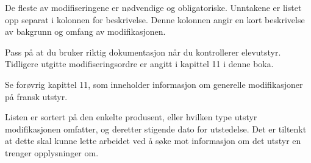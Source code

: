 De fleste av modifiseringene er nødvendige og obligatoriske. Unntakene er listet opp separat i kolonnen for beskrivelse. Denne kolonnen angir en kort beskrivelse av bakgrunn og omfang av modifikasjonen.

Pass på at du bruker riktig dokumentasjon når du kontrollerer elevutstyr. Tidligere utgitte modifiseringsordre er angitt i kapittel 11 i denne boka.

Se forøvrig kapittel 11, som inneholder informasjon om generelle modifikasjoner på fransk utstyr.

Listen er sortert på den enkelte produsent, eller hvilken type utstyr modifikasjonen omfatter, og deretter stigende dato for utstedelse. Det er tiltenkt at dette skal kunne lette arbeidet ved å søke mot informasjon om det utstyr en trenger opplysninger om.

